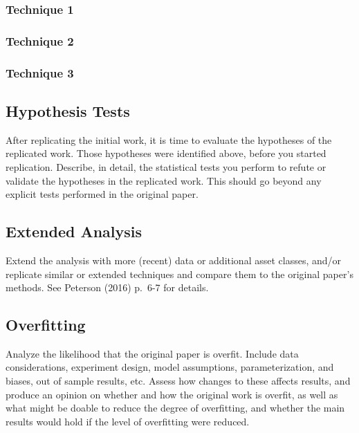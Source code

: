 \documentclass{article}
\begin{document}
\hypertarget{technique-1}{%
\subsubsection{Technique 1}\label{technique-1}}

\hypertarget{technique-2}{%
\subsubsection{Technique 2}\label{technique-2}}

\hypertarget{technique-3}{%
\subsubsection{Technique 3}\label{technique-3}}

\hypertarget{hypothesis-tests}{%
\subsection{Hypothesis Tests}\label{hypothesis-tests}}

After replicating the initial work, it is time to evaluate the
hypotheses of the replicated work. Those hypotheses were identified
above, before you started replication. Describe, in detail, the
statistical tests you perform to refute or validate the hypotheses in
the replicated work. This should go beyond any explicit tests performed
in the original paper.

\hypertarget{extended-analysis}{%
\subsection{Extended Analysis}\label{extended-analysis}}

Extend the analysis with more (recent) data or additional asset classes,
and/or replicate similar or extended techniques and compare them to the
original paper's methods. See Peterson (2016) p.~6-7 for details.

\hypertarget{overfitting}{%
\subsection{Overfitting}\label{overfitting}}

Analyze the likelihood that the original paper is overfit. Include data
considerations, experiment design, model assumptions, parameterization,
and biases, out of sample results, etc. Assess how changes to these
affects results, and produce an opinion on whether and how the original
work is overfit, as well as what might be doable to reduce the degree of
overfitting, and whether the main results would hold if the level of
overfitting were reduced.
\end{document}
